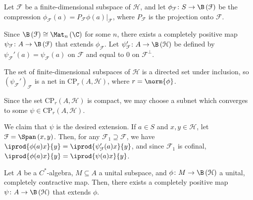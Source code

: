 \documentclass[10pt]{mypackage}
\begin{document}
\begin{theorem}
  Let $\mathcal{F}$ be a finite-dimensional subspace of $\mathcal{H}$, and let $\phi_{\mathcal{F}}\colon S\rightarrow \B\left( \mathcal{F} \right)$ be the compression $\phi_{\mathcal{F}}\left( a \right) = P_{\mathcal{F}}\phi(a)|_{\mathcal{F}}$, where $P_{\mathcal{F}}$ is the projection onto $\mathcal{F}$.\newline

  Since $\B\left( \mathcal{F} \right)\cong \Mat_n\left( \C \right)$ for some $n$, there exists a completely positive map $\psi_{\mathcal{F}}\colon A\rightarrow \B\left( \mathcal{F} \right)$ that extends $\phi_{\mathcal{F}}$. Let $\psi_{\mathcal{F}}'\colon A\rightarrow \B\left( \mathcal{H} \right)$ be defined by $\psi_{\mathcal{F}}'\left( a \right) = \psi_{\mathcal{F}}(a)$ on $\mathcal{F}$ and equal to $0$ on $\mathcal{F}^{\perp}$.\newline

  The set of finite-dimensional subspaces of $\mathcal{H}$ is a directed set under inclusion, so $\left( \psi_{\mathcal{F}}' \right)_{\mathcal{F}}$ is a net in $\text{CP}_{r}\left( A,\mathcal{H} \right)$, where $r = \norm{\phi}$.\newline

  Since the set $\text{CP}_{r}\left( A,\mathcal{H} \right)$ is compact, we may choose a subnet which converges to some $\psi\in \text{CP}_{r}\left( A,\mathcal{H} \right)$.\newline

  We claim that $\psi$ is the desired extension. If $a\in S$ and $x,y\in \mathcal{H}$, let $\mathcal{F} = \Span\left( x,y \right)$. Then, for any $\mathcal{F}_1\supseteq \mathcal{F}$, we have $ \iprod{\phi(a)x}{y} = \iprod{\psi_{\mathcal{F}}'(a)x}{y} $, and since $\mathcal{F}_1$ is cofinal, $ \iprod{\phi(a)x}{y} = \iprod{\psi(a)x}{y} $.
\end{theorem}
\begin{corollary}
  Let $A$ be a $C^{\ast}$-algebra, $M\subseteq A$ a unital subspace, and $\phi\colon M\rightarrow \B\left( \mathcal{H} \right)$ a unital, completely contractive map. Then, there exists a completely positive map $\psi\colon A\rightarrow \B\left( \mathcal{H} \right)$ that extends $\phi$.
\end{corollary}
\end{document}
